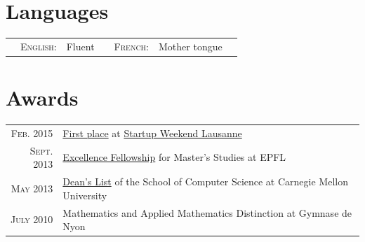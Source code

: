 \documentclass[a4paper,11pt]{article} %
\begin{document}

\section{Languages}

\begin{center}
\begin{tabularx}{\textwidth}{XrlXrlX}
&\textsc{\large{English:}} & Fluent & &
\textsc{\large{French:}} & Mother tongue & 
\end{tabularx}
\end{center}


\section{Awards}

\begin{tabular}{rl}

\textsc{Feb.} 2015 & 
\href{http://tasti.ch}{First place} at
\href{http://lausanne.startupweekend.org/}{Startup Weekend Lausanne}\\
\textsc{Sept.} 2013 & 
\href{http://master.epfl.ch/excellence-fellowships}{Excellence Fellowship} for Master's Studies at EPFL\\
\textsc{May} 2013 & 
\href{http://coursecatalog.web.cmu.edu/schoolofcomputerscience/#schoolofcomputersciencescsacademicstandardsandactions}{Dean's
List} of the School of Computer Science at Carnegie Mellon University\\
\textsc{July} 2010 & 
Mathematics and Applied Mathematics Distinction at Gymnase de Nyon\\
\end{tabular}

\pagebreak
{}


\end{document}
